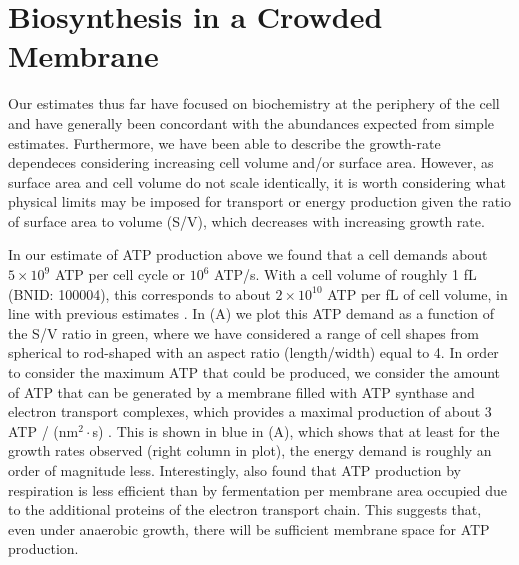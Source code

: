 \section{Biosynthesis in a Crowded Membrane}
Our estimates thus far have focused on biochemistry at the periphery of the
cell and have generally been concordant with the abundances expected from simple
estimates. Furthermore, we have been able to describe the growth-rate dependeces
considering increasing cell volume and/or surface area. However, as surface area
and cell volume do not scale identically, it is worth considering what physical
limits may be imposed for transport or energy production given the ratio of
surface area to volume (S/V), which decreases with increasing growth rate.



In our estimate of ATP production above we found that a cell demands about $5
\times 10^9$ ATP per cell cycle or $10^6$ ATP/s. With a cell volume of roughly 1
fL (BNID: 100004), this corresponds to about $2 \times 10^{10}$ ATP per fL of cell volume, in
line with previous estimates \citep{stouthamer1977, szenk2017}. In
 (A) we plot this ATP demand as a function of the S/V ratio
in green, where we have considered a range of cell shapes from spherical to
rod-shaped with an aspect ratio (length/width) equal to 4. In order to consider
the maximum ATP that could be produced, we consider the amount of ATP that can
be generated by a membrane filled with ATP synthase and electron transport
complexes, which provides a maximal production of about 3 ATP / (nm$^2 \cdot$s)
\citep{szenk2017}. This is shown in blue in (A), which shows
that at least for the growth rates observed (right column in plot), the energy
demand is roughly an order of magnitude less. Interestingly, \cite{szenk2017}
also found that ATP production by respiration is less efficient than by
fermentation per membrane area occupied due to the additional proteins of the
electron transport chain. This suggests that, even under anaerobic growth, there
will be sufficient membrane space for ATP production.

